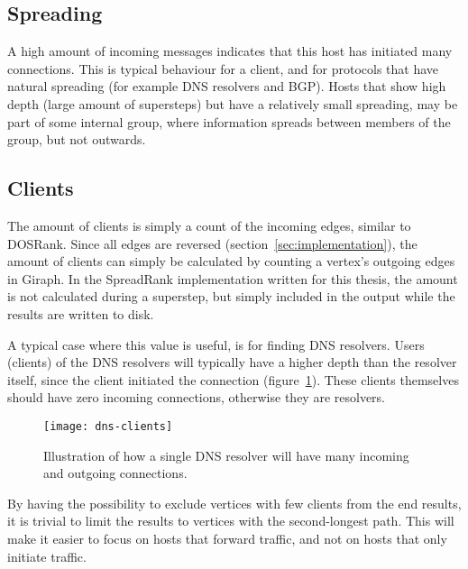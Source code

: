 \subsection{Spreading}
A high amount of incoming messages indicates that this host has initiated many connections.
This is typical behaviour for a client, and for protocols that have natural spreading (for example DNS resolvers and BGP).
Hosts that show high \gls{depth} (large amount of supersteps) but have a relatively small spreading,
 may be part of some internal group, where information spreads between members of the group, but not outwards.


\subsection{Clients}
The amount of clients is simply a count of the incoming edges, similar to DOSRank.
Since all edges are reversed (section~\ref{sec:implementation}),
 the amount of clients can simply be calculated by counting a vertex's outgoing edges in Giraph.
In the SpreadRank implementation written for this thesis,
 the amount is not calculated during a superstep, but simply included in the output while the results are written to disk.

A typical case where this value is useful, is for finding DNS resolvers.
Users (clients) of the DNS resolvers will typically have a higher \gls{depth} than the resolver itself,
 since the client initiated the connection (figure~\ref{fig:dns-clients}).
These clients themselves should have zero incoming connections, otherwise they are resolvers.

\begin{figure}[h]
	\caption{Illustration of how a single DNS resolver will have many incoming and outgoing connections.}
	\label{fig:dns-clients}
	\centering
		\texttt{[image: dns-clients]}
\end{figure}

By having the possibility to exclude vertices with few clients from the end results,
 it is trivial to limit the results to vertices with the second-longest path.
This will make it easier to focus on hosts that forward traffic, and not on hosts that only initiate traffic.

